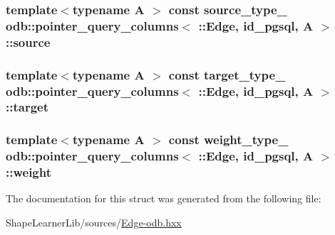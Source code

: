 \subsubsection[{source}]{\setlength{\rightskip}{0pt plus 5cm}template$<$typename A $>$ const {\bf source\+\_\+type\+\_\+} odb\+::pointer\+\_\+query\+\_\+columns$<$ \+::{\bf Edge}, id\+\_\+pgsql, A $>$\+::source\hspace{0.3cm}{\ttfamily [static]}}\label{structodb_1_1pointer__query__columns_3_01_1_1_edge_00_01id__pgsql_00_01_a_01_4_a22c9e04612308b34b4d54a9ca867faa2}
\hypertarget{structodb_1_1pointer__query__columns_3_01_1_1_edge_00_01id__pgsql_00_01_a_01_4_a9e1e1280fe43e78d10b5f06ace301bf5}{}
\subsubsection[{target}]{\setlength{\rightskip}{0pt plus 5cm}template$<$typename A $>$ const {\bf target\+\_\+type\+\_\+} odb\+::pointer\+\_\+query\+\_\+columns$<$ \+::{\bf Edge}, id\+\_\+pgsql, A $>$\+::target\hspace{0.3cm}{\ttfamily [static]}}\label{structodb_1_1pointer__query__columns_3_01_1_1_edge_00_01id__pgsql_00_01_a_01_4_a9e1e1280fe43e78d10b5f06ace301bf5}
\hypertarget{structodb_1_1pointer__query__columns_3_01_1_1_edge_00_01id__pgsql_00_01_a_01_4_a8dc325feaf38b41261e3d66ad6329b86}{}
\subsubsection[{weight}]{\setlength{\rightskip}{0pt plus 5cm}template$<$typename A $>$ const {\bf weight\+\_\+type\+\_\+} odb\+::pointer\+\_\+query\+\_\+columns$<$ \+::{\bf Edge}, id\+\_\+pgsql, A $>$\+::weight\hspace{0.3cm}{\ttfamily [static]}}\label{structodb_1_1pointer__query__columns_3_01_1_1_edge_00_01id__pgsql_00_01_a_01_4_a8dc325feaf38b41261e3d66ad6329b86}


The documentation for this struct was generated from the following file\+:\begin{DoxyCompactItemize}
\item 
Shape\+Learner\+Lib/sources/\hyperlink{_edge-odb_8hxx}{Edge-\/odb.\+hxx}\end{DoxyCompactItemize}
